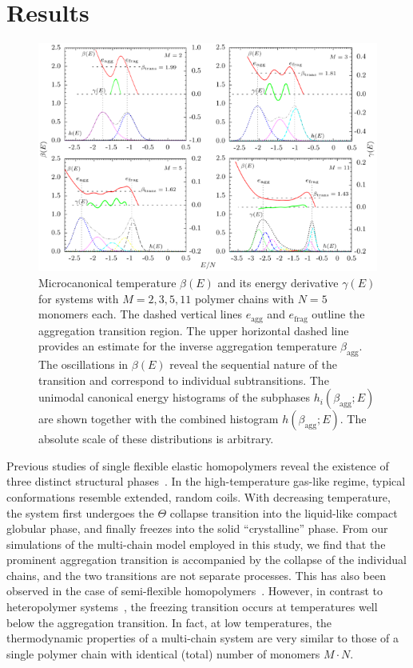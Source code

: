 \documentclass[12pt]{report}
\begin{document}
\section{Results}
\label{sec:res}
%
%
\begin{figure}
\center
\includegraphics[width = 1.03\textwidth]{chapter7Figs/combinedMicro.eps}
\caption{\label{fig:Fig_2}Microcanonical temperature
$\beta(E)$ and its energy derivative $\gamma(E)$ for systems with $M =
2,3,5,11$ polymer chains with $N=5$ monomers each. 
The dashed vertical lines $e_{\mathrm{agg}}$ and $e_{\mathrm{frag}}$
outline the aggregation transition region. The upper horizontal dashed line
provides an estimate for the inverse 
aggregation temperature $\beta_{\mathrm{agg}}$. 
The oscillations in $\beta(E)$ reveal the sequential nature of the
transition 
and correspond to individual subtransitions.
The unimodal canonical energy histograms of the subphases
$h_{i}(\beta_{\mathrm{agg}};E)$ are shown together with the combined
histogram $h(\beta_{\mathrm{agg}};E)$. The absolute scale of these
distributions is arbitrary.}
\end{figure}
%
Previous studies of single flexible elastic homopolymers reveal the
existence
of three distinct structural phases~\cite{Schnabel2009,svbj1}. 
In the high-temperature gas-like regime, typical
conformations resemble extended, random coils. With decreasing temperature,
the system
first undergoes the $\Theta$ collapse transition into the liquid-like
compact globular phase,
and finally freezes into the solid ``crystalline'' phase. From our
simulations of the
multi-chain model employed in this study, we find that the prominent
aggregation transition is accompanied by the 
collapse of the individual chains, and the two transitions are not
separate processes. This has also
been observed in the case of semi-flexible 
homopolymers~\cite{Junghans2009}. 
However, in contrast to heteropolymer systems~\cite{Junghans2011}, the
freezing
transition occurs at temperatures well below the aggregation transition.
In fact, at low
temperatures, the thermodynamic properties of a multi-chain system
are very similar to those
of a single polymer chain with identical (total) number of monomers
$M\cdot N$. 
\end{document}
